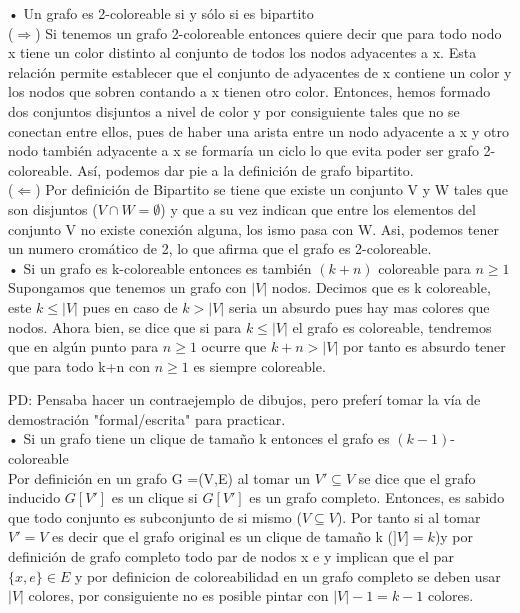 \documentclass[a4paper,12pt]{article}
\begin{document}
• Un grafo es 2-coloreable si y sólo si es bipartito \\

($\Rightarrow$) Si tenemos un grafo 2-coloreable entonces quiere decir que para todo nodo x tiene un color distinto al conjunto de todos los nodos adyacentes a x. Esta relación permite establecer que el conjunto de adyacentes de x contiene un color y los nodos que sobren contando a x tienen otro color. Entonces, hemos formado dos conjuntos disjuntos a nivel de color y por consiguiente tales que no se conectan entre ellos, pues de haber una arista entre un nodo adyacente a x y otro nodo también adyacente a x se formaría un ciclo lo que evita poder ser grafo 2-coloreable. Así, podemos dar pie a la definición de grafo bipartito. \\

($\Leftarrow$) Por definición de Bipartito se tiene que existe un conjunto V y W tales que son disjuntos ($V \cap W = \emptyset$) y que a su vez indican que entre los elementos del conjunto V no existe conexión alguna, los ismo pasa con W. Asi, podemos tener un numero cromático de 2, lo que afirma que el grafo es 2-coloreable. \\ 

• Si un grafo es k-coloreable entonces es también $(k + n)$ coloreable para $n \geq 1$ \\

Supongamos que tenemos un grafo con $|V|$ nodos. Decimos que es k coloreable, este $k \leq |V|$ pues en caso de $k > |V|$ seria un absurdo pues hay mas colores que nodos. Ahora bien, se dice que si para $k \leq |V|$ el grafo es coloreable, tendremos que en algún punto para $n \geq 1$ ocurre que $k+n > |V|$ por tanto es absurdo tener que para todo k+n con $n \geq 1$ es siempre coloreable. 

PD: Pensaba hacer un contraejemplo de dibujos, pero preferí tomar la vía de demostración "formal/escrita" para practicar.\\

• Si un grafo tiene un clique de tamaño k entonces el grafo es $(k-1)$-coloreable \\

Por definición en un grafo G =(V,E) al tomar un $V' \subseteq V$ se dice que el grafo inducido $G[V']$ es un clique si $G[V']$ es un grafo completo. Entonces, es sabido que todo conjunto es subconjunto de si mismo ($V \subseteq V$). Por tanto si al tomar $V' = V$ es decir que el grafo original es un clique de tamaño k ($]V]=k$)y por definición de grafo completo todo par de nodos x e y implican que el par $\{x,e\} \in E$ y por definicion de coloreabilidad en un grafo completo se deben usar $|V|$ colores, por consiguiente no es posible pintar con $|V|-1 = k-1$ colores.
 
\end{document}
